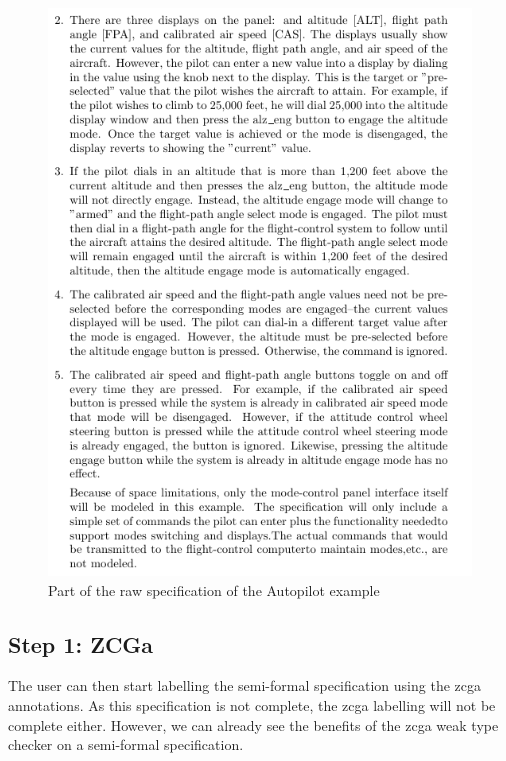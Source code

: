 \begin{figure}[H]
\begin{minipage}{0.45\textwidth}
    \includegraphics[width=\textwidth]{Figures/fullexample/0auto2.png}
    \end{minipage}
    \caption{Part of the raw specification of the Autopilot example \label{fig:rawautocomp}}
    \end{figure}



 \subsection{Step 1: ZCGa}

 The user can then start labelling the semi-formal specification using the
 \gls{zcga} annotations. As this specification is not complete, the \gls{zcga}
 labelling will not be complete either. However, we can already see the benefits
of the
 \gls{zcga} weak type checker on a semi-formal specification.

